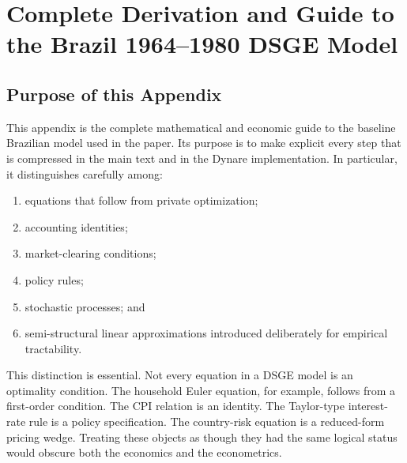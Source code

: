 
%
%

\appendix
\section{Complete Derivation and Guide to the Brazil 1964--1980 DSGE Model}
\label{app:model_bible}

\subsection{Purpose of this Appendix}
\label{app:purpose}

This appendix is the complete mathematical and economic guide to the baseline
Brazilian model used in the paper. Its purpose is to make explicit every step
that is compressed in the main text and in the Dynare implementation. In
particular, it distinguishes carefully among:

\begin{enumerate}
    \item equations that follow from private optimization;
    \item accounting identities;
    \item market-clearing conditions;
    \item policy rules;
    \item stochastic processes; and
    \item semi-structural linear approximations introduced deliberately for
    empirical tractability.
\end{enumerate}

This distinction is essential. Not every equation in a DSGE model is an
optimality condition. The household Euler equation, for example, follows from a
first-order condition. The CPI relation is an identity. The Taylor-type
interest-rate rule is a policy specification. The country-risk equation is a
reduced-form pricing wedge. Treating these objects as though they had the same
logical status would obscure both the economics and the econometrics.

